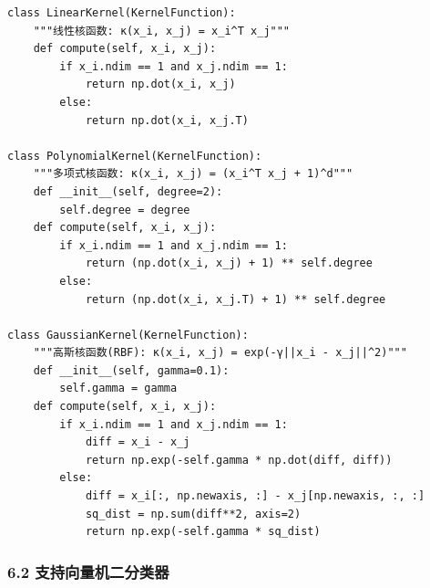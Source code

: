 \documentclass[12pt,a4paper]{ctexart}
\begin{document}
	\begin{lstlisting}
class LinearKernel(KernelFunction):
	"""线性核函数: κ(x_i, x_j) = x_i^T x_j"""
	def compute(self, x_i, x_j):
		if x_i.ndim == 1 and x_j.ndim == 1:
			return np.dot(x_i, x_j)
		else:
			return np.dot(x_i, x_j.T)

class PolynomialKernel(KernelFunction):
	"""多项式核函数: κ(x_i, x_j) = (x_i^T x_j + 1)^d"""
	def __init__(self, degree=2):
		self.degree = degree
	def compute(self, x_i, x_j):
		if x_i.ndim == 1 and x_j.ndim == 1:
			return (np.dot(x_i, x_j) + 1) ** self.degree
		else:
			return (np.dot(x_i, x_j.T) + 1) ** self.degree

class GaussianKernel(KernelFunction):
	"""高斯核函数(RBF): κ(x_i, x_j) = exp(-γ||x_i - x_j||^2)"""
	def __init__(self, gamma=0.1):
		self.gamma = gamma
	def compute(self, x_i, x_j):
		if x_i.ndim == 1 and x_j.ndim == 1:
			diff = x_i - x_j
			return np.exp(-self.gamma * np.dot(diff, diff))
		else:
			diff = x_i[:, np.newaxis, :] - x_j[np.newaxis, :, :]
			sq_dist = np.sum(diff**2, axis=2)
			return np.exp(-self.gamma * sq_dist)
	\end{lstlisting}
	
	\subsubsection*{6.2 支持向量机二分类器}
	
\end{document}

